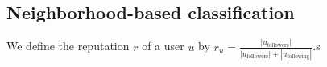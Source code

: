 \subsection{Neighborhood-based classification}
\label{sec:approach}

We define the reputation $r$ of a user $u$ by $r_u = \frac{ |u_\text{followers}| }{ |u_\text{followers}| + |u_\text{following}| }$.s

